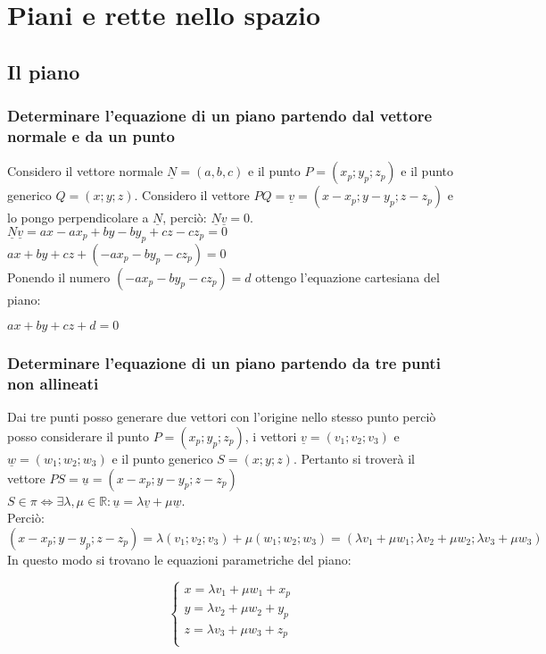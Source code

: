 \chapter{Piani e rette nello spazio}
\section{Il piano}
\subsection{Determinare l'equazione di un piano partendo dal vettore normale e da un punto}
Considero il vettore normale $\underline{N}=(a,b,c)$ e il punto $P=(x_p;y_p;z_p)$ e il punto generico $Q=(x;y;z)$. Considero il vettore $PQ=\underline{v}=(x-x_p;y-y_p;z-z_p)$
e lo pongo perpendicolare a $\underline{N}$, perci\`o: $\underline{N}\underline{v}=0$.\\
$\underline{N}\underline{v}=ax-ax_p+by-by_p+cz-cz_p=0$\\
$ax+by+cz+(-ax_p-by_p-cz_p)=0$\\
Ponendo il numero $(-ax_p-by_p-cz_p)=d$ ottengo l'equazione cartesiana del piano:
\begin{center}
$ax+by+cz+d=0$
\end{center}
\subsection{Determinare l'equazione di un piano partendo da tre punti non allineati}
Dai tre punti posso generare due vettori con l'origine nello stesso punto perci\`o posso considerare il punto $P=(x_p;y_p;z_p)$, i vettori $\underline{v}=(v_1;v_2;v_3)$ e 
$\underline{w}=(w_1;w_2;w_3)$ e il punto generico $S=(x;y;z)$. Pertanto si trover\`a il vettore $PS=\underline{u}=(x-x_p;y-y_p;z-z_p)$\\
$S\in\pi\Leftrightarrow \exists\lambda,\mu\in\mathbb{R}:\underline{u}=\lambda\underline{v}+\mu\underline{w}$.\\
Perci\`o: $(x-x_p;y-y_p;z-z_p)=\lambda(v_1;v_2;v_3)+\mu(w_1;w_2;w_3)=(\lambda v_1+\mu w_1;\lambda v_2+\mu w_2;\lambda v_3+\mu w_3)$\\
In questo modo si trovano le equazioni parametriche del piano:
\begin{center}
\begin{equation}
\begin{cases}
x=\lambda v_1+\mu w_1+x_p\\
y=\lambda v_2+\mu w_2+y_p\\
z=\lambda v_3+\mu w_3+z_p\\
\end{cases}
\end{equation}
\end{center}
